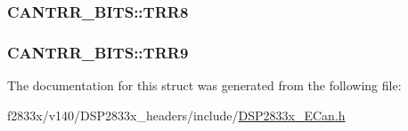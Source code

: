 \subsubsection[{T\+R\+R8}]{ C\+A\+N\+T\+R\+R\+\_\+\+B\+I\+T\+S\+::\+T\+R\+R8}\label{struct_c_a_n_t_r_r___b_i_t_s_adbb0fc13c917762275556344c1ad6830}
\hypertarget{struct_c_a_n_t_r_r___b_i_t_s_ae367f287277c58ceb516858731044041}{}
\subsubsection[{T\+R\+R9}]{ C\+A\+N\+T\+R\+R\+\_\+\+B\+I\+T\+S\+::\+T\+R\+R9}\label{struct_c_a_n_t_r_r___b_i_t_s_ae367f287277c58ceb516858731044041}


The documentation for this struct was generated from the following file\+:\begin{DoxyCompactItemize}
\item 
f2833x/v140/\+D\+S\+P2833x\+\_\+headers/include/\hyperlink{_d_s_p2833x___e_can_8h}{D\+S\+P2833x\+\_\+\+E\+Can.\+h}\end{DoxyCompactItemize}
